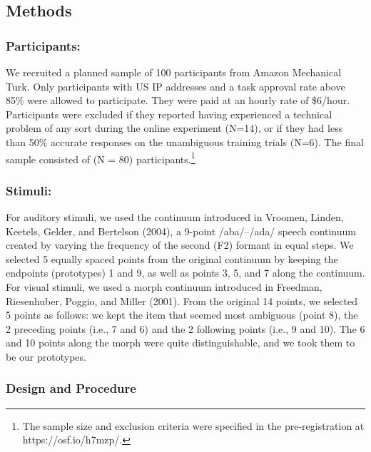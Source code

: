 \documentclass[english,man]{apa6}
\theoremstyle{definition}
\theoremstyle{definition}
\theoremstyle{definition}
\theoremstyle{remark}
\begin{document}
\subsection{Methods}\label{methods}

\subsubsection{Participants:}\label{participants}

We recruited a planned sample of 100 participants from Amazon Mechanical
Turk. Only participants with US IP addresses and a task approval rate
above 85\% were allowed to participate. They were paid at an hourly rate
of \$6/hour. Participants were excluded if they reported having
experienced a technical problem of any sort during the online experiment
(N=14), or if they had less than 50\% accurate responses on the
unambiguous training trials (N=6). The final sample consisted of (N =
80)
participants.\footnote{The sample size and exclusion criteria were specified in the pre-registration at https://osf.io/h7mzp/.}

\subsubsection{Stimuli:}\label{stimuli}

For auditory stimuli, we used the continuum introduced in Vroomen,
Linden, Keetels, Gelder, and Bertelson (2004), a 9-point /aba/--/ada/
speech continuum created by varying the frequency of the second (F2)
formant in equal steps. We selected 5 equally spaced points from the
original continuum by keeping the endpoints (prototypes) 1 and 9, as
well as points 3, 5, and 7 along the continuum. For visual stimuli, we
used a morph continuum introduced in Freedman, Riesenhuber, Poggio, and
Miller (2001). From the original 14 points, we selected 5 points as
follows: we kept the item that seemed most ambiguous (point 8), the 2
preceding points (i.e., 7 and 6) and the 2 following points (i.e., 9 and
10). The 6 and 10 points along the morph were quite distinguishable, and
we took them to be our prototypes.

\subsubsection{Design and Procedure}\label{design-and-procedure}
\end{document}
